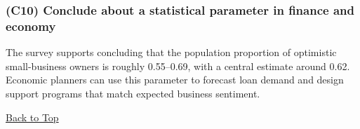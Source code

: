 \subsubsection{(C10) Conclude about a statistical parameter in finance and economy}\label{subsubsec:interval-example2-1-c10}

The survey supports concluding that the population proportion of optimistic small-business owners is roughly 0.55--0.69, with a central estimate around 0.62. Economic planners can use this parameter to forecast loan demand and design support programs that match expected business sentiment.

\vspace{6pt}
\noindent\hyperref[table-of-contents]{Back to Top}
